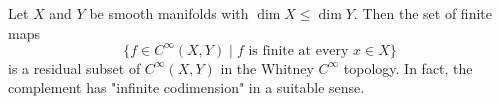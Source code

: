 Let $X$ and $Y$ be smooth manifolds with $\dim X \leq \dim Y$. Then the set of finite maps
$$\{ f \in C^\infty(X, Y) \mid \text{$f$ is finite at every } x \in X \}$$
is a residual subset of $C^\infty(X, Y)$ in the Whitney $C^\infty$ topology. In fact, the complement has "infinite codimension" in a suitable sense.
